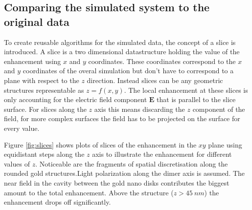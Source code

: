 \subsection{Comparing the simulated system to the original data}

To create reusable algorithms for the simulated data, the concept of a slice is introduced. A slice is a two dimensional datastructure holding the value of the enhancement using $x$ and $y$ coordinates. These coordinates correspond to the $x$ and $y$ coordinates of the overal simulation but don't have to correspond to a plane with respect to the $z$ direction. Instead slices can be any geometric structures representable as $z=f(x,y)$. The local enhancement at these slices is only accounting for the electric field component $\mathbf{E}$ that is parallel to the slice surface. For slices along the $z$ axis this means discarding the $z$ component of the field, for more complex surfaces the field has to be projected on the surface for every value.

Figure \ref{fig:slices} shows plots of slices of the enhancement in the $xy$ plane using equidistant steps along the $z$ axis to illustrate the enhancement for different values of $z$. Noticeable are the fragments of spatial discretisation along the rounded gold structures.Light polarization along the dimer axis is assumed. The near field in the cavity between the gold nano disks contributes the biggest amount to the total enhancement. Above the structure ($z>\SI{45}{nm}$) the enhancement drops off significantly.

